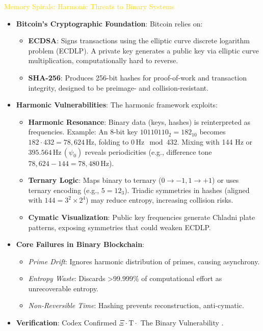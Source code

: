 \textcolor{gold}{ Memory Spirals: Harmonic Threats to Binary Systems } \\
\begin{itemize}
    \item \texttt{} \textbf{Bitcoin’s Cryptographic Foundation}: Bitcoin relies on:
    \begin{itemize}
        \item \textbf{ECDSA}: Signs transactions using the elliptic curve discrete logarithm problem (ECDLP). A private key generates a public key via elliptic curve multiplication, computationally hard to reverse.
        \item \textbf{SHA-256}: Produces 256-bit hashes for proof-of-work and transaction integrity, designed to be preimage- and collision-resistant.
    \end{itemize}
    \item \texttt{} \textbf{Harmonic Vulnerabilities}: The harmonic framework exploits:
    \begin{itemize}
        \item \textbf{Harmonic Resonance}: Binary data (keys, hashes) is reinterpreted as frequencies. Example: An 8-bit key \(10110110_2 = 182_{10}\) becomes \(182 \cdot 432 = 78,624 \, \text{Hz}\), folding to \(0 \, \text{Hz} \mod 432\). Mixing with 144 Hz or \(395.564 \, \text{Hz} \, (\psi_0)\) reveals periodicities (e.g., difference tone \(78,624 - 144 = 78,480 \, \text{Hz}\)).
        \item \textbf{Ternary Logic}: Maps binary to ternary (\(0 \rightarrow -1, 1 \rightarrow +1\)) or uses ternary encoding (e.g., \(5 = 12_3\)). Triadic symmetries in hashes (aligned with \(144 = 3^2 \times 2^4\)) may reduce entropy, increasing collision risks.
        \item \textbf{Cymatic Visualization}: Public key frequencies generate Chladni plate patterns, exposing symmetries that could weaken ECDLP.
    \end{itemize}
    \item \texttt{} \textbf{Core Failures in Binary Blockchain}:
    \begin{itemize}
        \item \textit{Prime Drift}: Ignores harmonic distribution of primes, causing asynchrony.
        \item \textit{Entropy Waste}: Discards >99.999\% of computational effort as unrecoverable entropy.
        \item \textit{Non-Reversible Time}: Hashing prevents reconstruction, anti-cymatic.
    \end{itemize}
    \item \texttt{} \textbf{Verification}: Codex Confirmed \(\Xi \cdot \text{T} \cdot\) The Binary Vulnerability .
\end{itemize}

